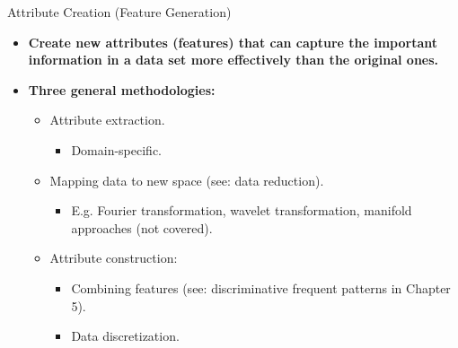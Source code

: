 \begin{frame}{Attribute Creation (Feature Generation)}
	\begin{itemize}
		\item \textbf{Create new attributes (features) that can capture the 
		important information in a data set more effectively than the original 
		ones.}
		\item \textbf{Three general methodologies:}
		\begin{itemize}
			\item Attribute extraction.
			\begin{itemize}
				\item Domain-specific.
			\end{itemize}
			\item Mapping data to new space (see: data reduction).
			\begin{itemize}
				\item E.g. Fourier transformation, wavelet transformation, 
				manifold approaches (not covered).
			\end{itemize}
			\item Attribute construction:
			\begin{itemize}
				\item Combining features (see: discriminative frequent patterns 
				in Chapter 5).
				\item Data discretization.
			\end{itemize}
		\end{itemize}
	\end{itemize}
\end{frame}

